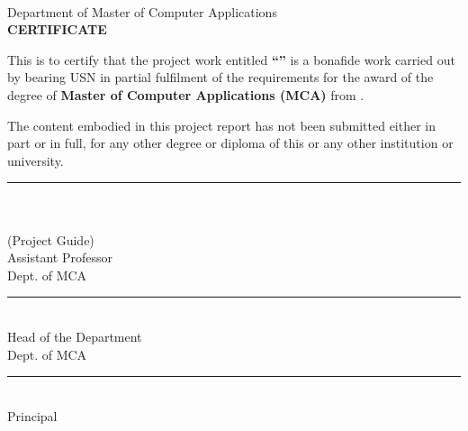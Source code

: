 \thispagestyle{plain}
\begin{center}
  \vspace*{1cm}
  {\Large \textbf{\collegeName}}\\[0.3cm]
  {\large Department of Master of Computer Applications}\\[2cm]
  {\LARGE \textbf{CERTIFICATE}}\\[1.5cm]
\end{center}

\begin{center}
  \begin{minipage}{0.9\textwidth}
    \large
    \noindent This is to certify that the project work entitled \textbf{``\projectTitle''} is a bonafide work carried out by \textbf{\studentName} bearing USN \textbf{\usnNumber} in partial fulfilment of the requirements for the award of the degree of \textbf{Master of Computer Applications (MCA)} from \collegeName.

    \vspace{1.5cm}

    \noindent The content embodied in this project report has not been submitted either in part or in full, for any other degree or diploma of this or any other institution or university.

    \vspace{3cm}

    \noindent\begin{minipage}{0.45\textwidth}
      \centering
      \rule{5cm}{0.5pt}\\
      \guideName\\
      (Project Guide)\\
      Assistant Professor\\
      Dept. of MCA\\
      \collegeName
    \end{minipage}
    \hfill
    \begin{minipage}{0.45\textwidth}
      \centering
      \rule{5cm}{0.5pt}\\
      Head of the Department\\
      Dept. of MCA\\
      \collegeName
    \end{minipage}

    \vspace{2cm}

    \noindent\begin{minipage}{0.45\textwidth}
      \centering
      \rule{5cm}{0.5pt}\\
      Principal\\
      \collegeName
    \end{minipage}
    \hfill
    \begin{minipage}{0.45\textwidth}
      \centering
      \vspace{1cm}
    \end{minipage}
  \end{minipage}
\end{center}
